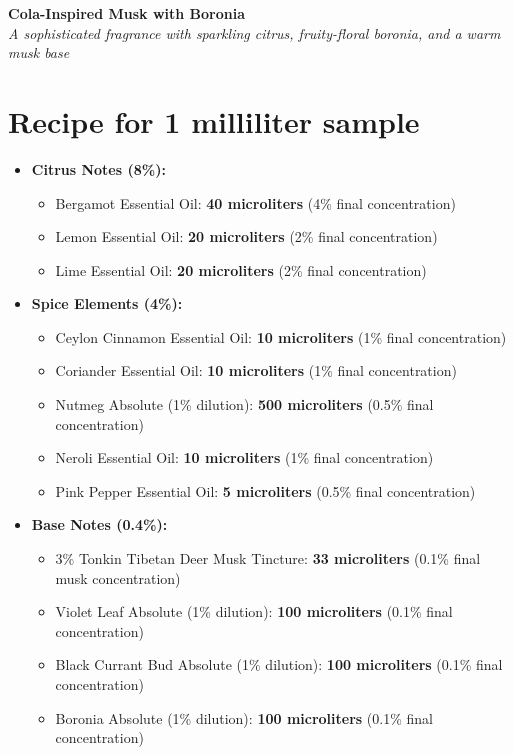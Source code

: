 \documentclass{article}
\begin{document}
\begin{center}
\textcolor{boroniaViolet}{\LARGE\textbf{Cola-Inspired Musk with Boronia}}\\[0.5cm]
\textcolor{colaBrown}{\large\textit{A sophisticated fragrance with sparkling citrus, fruity-floral boronia, and a warm musk base}}\\[1cm]
\end{center}

\section*{Recipe for 1 milliliter sample}

\begin{itemize}[leftmargin=*]
  \item \textcolor{pepperRed}{\textbf{Citrus Notes (8\%):}}
  \begin{itemize}
    \item Bergamot Essential Oil: \textbf{40 microliters} (4\% final concentration)
    \item Lemon Essential Oil: \textbf{20 microliters} (2\% final concentration)
    \item Lime Essential Oil: \textbf{20 microliters} (2\% final concentration)
  \end{itemize}
  
  \item \textcolor{pepperRed}{\textbf{Spice Elements (4\%):}}
  \begin{itemize}
    \item Ceylon Cinnamon Essential Oil: \textbf{10 microliters} (1\% final concentration)
    \item Coriander Essential Oil: \textbf{10 microliters} (1\% final concentration)
    \item Nutmeg Absolute (1\% dilution): \textbf{500 microliters} (0.5\% final concentration)
    \item Neroli Essential Oil: \textbf{10 microliters} (1\% final concentration)
    \item Pink Pepper Essential Oil: \textbf{5 microliters} (0.5\% final concentration)
  \end{itemize}
  
  \item \textcolor{pepperRed}{\textbf{Base Notes (0.4\%):}}
  \begin{itemize}
    \item 3\% Tonkin Tibetan Deer Musk Tincture: \textbf{33 microliters} (0.1\% final musk concentration)
    \item Violet Leaf Absolute (1\% dilution): \textbf{100 microliters} (0.1\% final concentration)
    \item Black Currant Bud Absolute (1\% dilution): \textbf{100 microliters} (0.1\% final concentration)
    \item Boronia Absolute (1\% dilution): \textbf{100 microliters} (0.1\% final concentration)
  \end{itemize}
  

\end{itemize}
\end{document}
